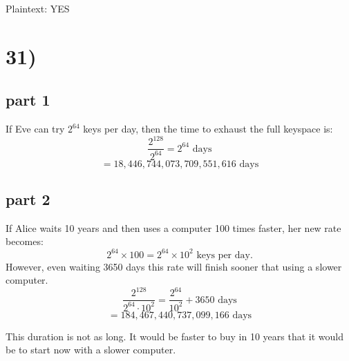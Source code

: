 \documentclass[12pt]{article}
\begin{document}
Plaintext: YES







\newpage

\section*{31)}
\subsection*{part 1}

If Eve can try \( 2^{64} \) keys per day, then the time to exhaust the full keyspace is:
\[
\frac{2^{128}}{2^{64}} = 2^{64} \text{ days}
\]
\[
= 18,446,744,073,709,551,616 \text{ days}
\]
\subsection*{part 2}
If Alice waits 10 years and then uses a computer 100 times faster, her new rate becomes:
\[
2^{64} \times 100 = 2^{64} \times 10^2 \text{ keys per day}.
\]
However, even waiting 3650 days this rate will finish sooner that using a slower computer.
\[
\frac{2^{128}}{2^{64} \cdot 10^2} = \frac{2^{64}}{10^2} + 3650 \text{ days} 
\]
\[
= 184,467,440,737,099,166 \text{ days}
\]



This duration is not as long. It would be faster to buy in 10 years that it would be to start now with a slower computer.
\end{document}
